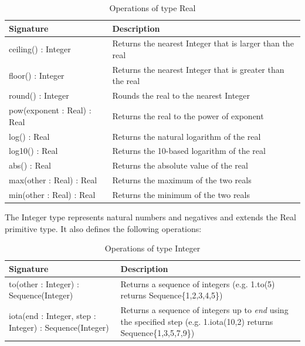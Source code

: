 \begin{longtabu} {|p{6.5cm}|X|}
			
			\caption{Operations of type Real}
			\label{tab:RealOperations}\\
			
			\hline
			
			\textbf{Signature} & \textbf{Description} \\\hline

			ceiling() : Integer & Returns the nearest Integer that is larger than the real\\\hline
			
			floor() : Integer & Returns the nearest Integer that is greater than the real\\\hline
			
			round() : Integer & Rounds the real to the nearest Integer\\\hline
			
			pow(exponent : Real) : Real & Returns the real to the power of exponent \\\hline
			
			log() : Real & Returns the natural logarithm of the real \\\hline
			
			log10() : Real & Returns the 10-based logarithm of the real \\\hline 
			
			abs() : Real & Returns the absolute value of the real \\\hline
			
			max(other : Real) : Real & Returns the maximum of the two reals \\\hline
			
			min(other : Real) : Real & Returns the minimum of the two reals \\\hline
			
\end{longtabu}

The Integer type represents natural numbers and negatives and extends the Real primitive type. It also defines the following operations:

\begin{longtabu} {|p{6.5cm}|X|}
			
			\caption{Operations of type Integer}
			\label{tab:IntegerOperations}\\
			
			\hline
							
			\textbf{Signature} & \textbf{Description} \\\hline

			to(other : Integer) : Sequence(Integer) & Returns a sequence of integers (e.g. 1.to(5) returns Sequence\{1,2,3,4,5\})\\\hline
			
			iota(end : Integer, step : Integer) : Sequence(Integer) & Returns a sequence of integers up to \emph{end} using the specified step (e.g. 1.iota(10,2) returns Sequence\{1,3,5,7,9\})\\\hline
			
\end{longtabu}

